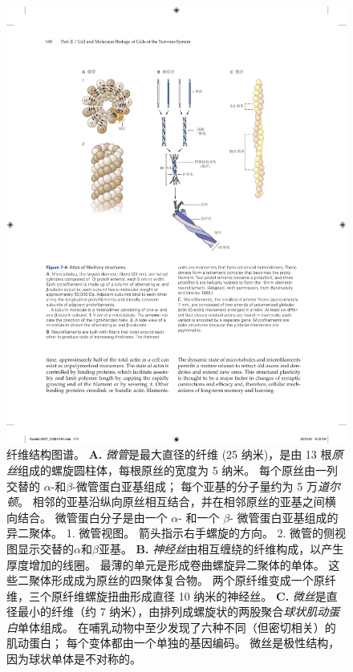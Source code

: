 \begin{figure}[htbp]
	\centering
	\includegraphics[width=1.0\linewidth]{chap07/fig_7_6}
	\caption{纤维结构图谱。
		\textbf{A.} \textit{微管}是最大直径的纤维 (25 纳米)，是由 13 根\textit{原丝}组成的螺旋圆柱体，每根原丝的宽度为 5 纳米。
		每个原丝由一列交替的 $\alpha$-和$\beta$-微管蛋白亚基组成；
		每个亚基的分子量约为 5 万\textit{道尔顿}。
		相邻的亚基沿纵向原丝相互结合，并在相邻原丝的亚基之间横向结合。
		微管蛋白分子是由一个 $\alpha$- 和一个 $\beta$- 微管蛋白亚基组成的异二聚体。
		1. 微管视图。
		箭头指示右手螺旋的方向。
		2. 微管的侧视图显示交替的$\alpha$和$\beta$亚基。
		\textbf{B.} \textit{神经丝}由相互缠绕的纤维构成，以产生厚度增加的线圈。
		最薄的单元是形成卷曲螺旋异二聚体的单体。
		这些二聚体形成成为原丝的四聚体复合物。
		两个原纤维变成一个原纤维，三个原纤维螺旋扭曲形成直径 10 纳米的神经丝\cite{bershadsky2012cytoskeleton}。
		\textbf{C.} \textit{微丝}是直径最小的纤维（约 7 纳米），由排列成螺旋状的两股聚合\textit{球状肌动蛋白}单体组成。
		在哺乳动物中至少发现了六种不同（但密切相关）的肌动蛋白；
		每个变体都由一个单独的基因编码。
		微丝是极性结构，因为球状单体是不对称的。}
	\label{fig:7_6}
\end{figure}


